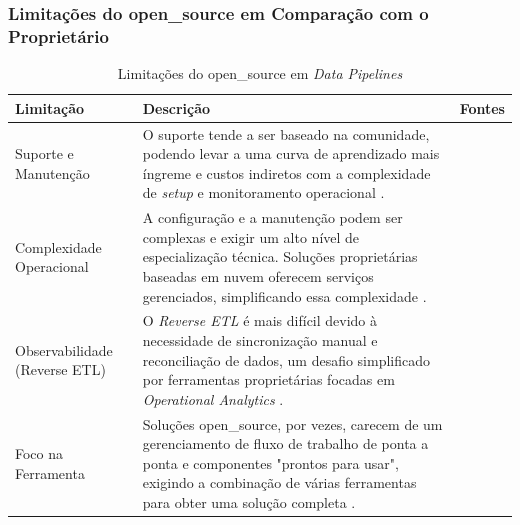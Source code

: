 \subsubsection{Limitações do \acs{open_source} em Comparação com o Proprietário}
\begin{table}[h!]
    \label{tab:limitacoes_os}
    \small
    \begin{tabular}{p{3.0cm} p{8.5cm} p{1.5cm}}
        \toprule
        \textbf{Limitação} & \textbf{Descrição} & \textbf{Fontes} \\
        \midrule
        Suporte e Manutenção & O suporte tende a ser baseado na comunidade, podendo levar a uma curva de aprendizado mais íngreme e custos indiretos com a complexidade de \textit{setup} e monitoramento operacional \cite[]{mbata2024survey, septian2019}. & \cite[]{mbata2024survey, septian2019} \\
        \rowcolor[gray]{0.95}
        Complexidade Operacional & A configuração e a manutenção podem ser complexas e exigir um alto nível de especialização técnica. Soluções proprietárias baseadas em nuvem oferecem serviços gerenciados, simplificando essa complexidade \cite[]{septian2019, murarka2024}. & \cite[]{septian2019, murarka2024} \\
        Observabilidade (Reverse ETL) & O \textit{Reverse ETL} é mais difícil devido à necessidade de sincronização manual e reconciliação de dados, um desafio simplificado por ferramentas proprietárias focadas em \textit{Operational Analytics} \cite[]{reverseetl2022}. & \cite[]{reverseetl2022} \\
        \rowcolor[gray]{0.95}
        Foco na Ferramenta & Soluções \acs{open_source}, por vezes, carecem de um gerenciamento de fluxo de trabalho de ponta a ponta e componentes "prontos para usar", exigindo a combinação de várias ferramentas para obter uma solução completa \cite[]{mbata2024survey}. & \cite[]{mbata2024survey} \\
        \bottomrule
    \end{tabular}
        \centering
    \caption{Limitações do \acs{open_source} em \textit{Data Pipelines}}
\end{table}
